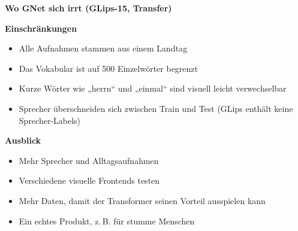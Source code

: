 \documentclass[a0,portrait]{a0poster}
\newcommand{\phead}[1]{{\color{bwkiblau}\normalsize\bfseries #1}\par\vspace{0.2cm}}
\begin{document}
\begin{minipage}[t]{\rcol}\vspace{0pt}
\phead{Wo GNet sich irrt (GLips-15, Transfer)}
\end{minipage}\hfill
\begin{minipage}[t]{\rcol}\vspace{0pt}
\phead{Einschränkungen}
\begin{itemize}
  \item Alle Aufnahmen stammen aus einem Landtag
  \item Das Vokabular ist auf 500 Einzelwörter begrenzt
  \item Kurze Wörter wie „herrn“ und „einmal“ sind visuell leicht verwechselbar
  \item Sprecher überschneiden sich zwischen Train und Test (GLips enthält keine Sprecher-Labels)
\end{itemize}

\vspace{0.5cm}
\phead{Ausblick}
\begin{itemize}
  \item Mehr Sprecher und Alltagsaufnahmen
  \item Verschiedene visuelle Frontends testen
  \item Mehr Daten, damit der Transformer seinen Vorteil ausspielen kann
  \item Ein echtes Produkt, z.\,B. für stumme Menschen
\end{itemize}
\end{minipage}\hfill
\end{document}
